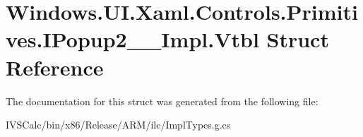 \hypertarget{struct_windows_1_1_u_i_1_1_xaml_1_1_controls_1_1_primitives_1_1_i_popup2_____impl_1_1_vtbl}{}\section{Windows.\+U\+I.\+Xaml.\+Controls.\+Primitives.\+I\+Popup2\+\_\+\+\_\+\+Impl.\+Vtbl Struct Reference}
\label{struct_windows_1_1_u_i_1_1_xaml_1_1_controls_1_1_primitives_1_1_i_popup2_____impl_1_1_vtbl}


The documentation for this struct was generated from the following file\+:\begin{DoxyCompactItemize}
\item 
I\+V\+S\+Calc/bin/x86/\+Release/\+A\+R\+M/ilc/Impl\+Types.\+g.\+cs\end{DoxyCompactItemize}
